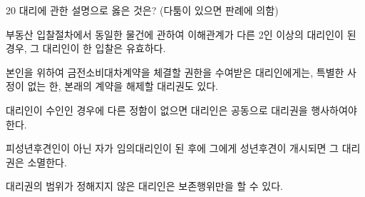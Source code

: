 \begin{question}{20}
대리에 관한 설명으로 옳은 것은? (다툼이 있으면 판례에 의함)
\begin{choices}
  \item 부동산 입찰절차에서 동일한 물건에 관하여 이해관계가 다른 2인 이상의 대리인이 된 경우, 그 대리인이 한 입찰은 유효하다.
  \item 본인을 위하여 금전소비대차계약을 체결할 권한을 수여받은 대리인에게는, 특별한 사정이 없는 한, 본래의 계약을 해제할 대리권도 있다.
  \item 대리인이 수인인 경우에 다른 정함이 없으면 대리인은 공동으로 대리권을 행사하여야 한다.
  \item 피성년후견인이 아닌 자가 임의대리인이 된 후에 그에게 성년후견이 개시되면 그 대리권은 소멸한다.
  \item 대리권의 범위가 정해지지 않은 대리인은 보존행위만을 할 수 있다.
\end{choices}
\end{question}
